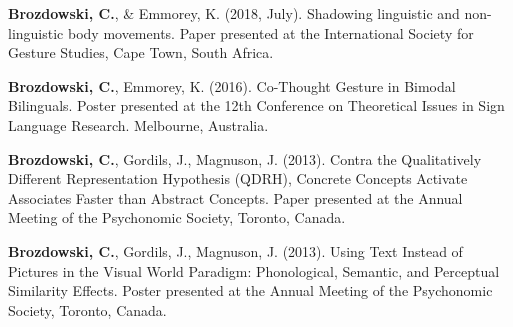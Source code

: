 \begin{cvparagraphlist}
  \textbf{Brozdowski, C.}, \& Emmorey, K. (2018, July). Shadowing linguistic and non-linguistic body movements. Paper presented at the International Society for Gesture Studies, Cape Town, South Africa. \par
  \textbf{Brozdowski, C.}, Emmorey, K. (2016). Co-Thought Gesture in Bimodal Bilinguals. Poster presented at the 12th Conference on Theoretical Issues in Sign Language Research. Melbourne, Australia. \par
  \textbf{Brozdowski, C.}, Gordils, J., Magnuson, J. (2013). Contra the Qualitatively Different Representation Hypothesis (QDRH), Concrete Concepts Activate Associates Faster than Abstract Concepts. Paper presented at the Annual Meeting of the Psychonomic Society, Toronto, Canada. \par
  \textbf{Brozdowski, C.}, Gordils, J., Magnuson, J. (2013). Using Text Instead of Pictures in the Visual World Paradigm: Phonological, Semantic, and Perceptual Similarity Effects. Poster presented at the Annual Meeting of the Psychonomic Society, Toronto, Canada.  \par
\end{cvparagraphlist}